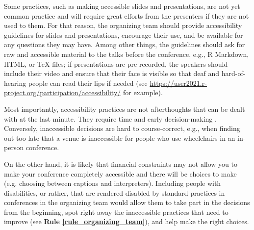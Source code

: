 \documentclass[10pt,letterpaper]{article}
\begin{document}
Some practices, such as making accessible slides and presentations, are not yet common practice and will require great efforts from the presenters if they are not used to them. 
For that reason, the organizing team should provide accessibility guidelines for slides and presentations, encourage their use, and be available for any questions they may have.  
Among other things, the guidelines should ask for raw and accessible material to the talks before the conference, e.g., R Markdown, HTML, or \TeX{} files; if presentations are pre-recorded, the speakers should include their video and ensure that their face is visible so that deaf and hard-of-hearing people can read their lips if needed (see \url{https://user2021.r-project.org/participation/accessibility/} for example). 


 
Most importantly, accessibility practices are not afterthoughts that can be dealt with at the last minute. 
They require time and early decision-making \cite{irishIncreasingParticipationUsing2020}. 
Conversely, inaccessible decisions are hard to course-correct, e.g., when finding out too late that a venue is inaccessible for people who use wheelchairs in an in-person conference. 

On the other hand, it is likely that financial constraints may not allow you to make your conference completely accessible and there will be choices to make (e.g. choosing between captions and interpreters). 
Including people with disabilities, or rather, that are rendered disabled by standard practices in conferences in the organizing team would allow them to take part in the decisions from the beginning, spot right away the inaccessible practices that need to improve (see \textbf{Rule \ref{rule_organizing_team}}), and help make the right choices.
\end{document}

